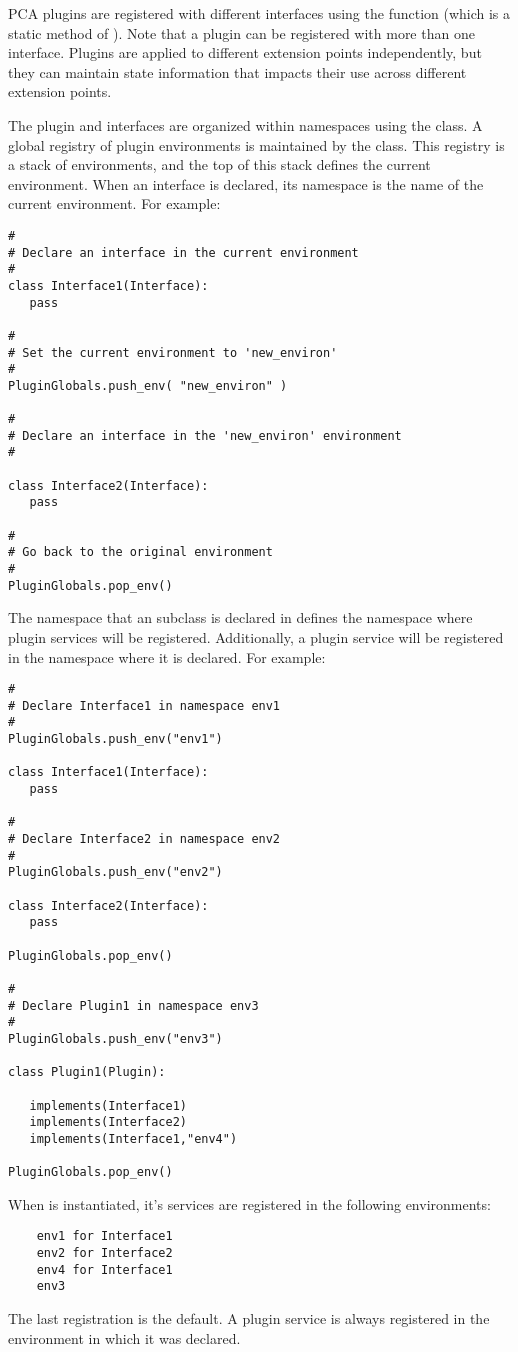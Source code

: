 PCA plugins are registered with different interfaces using the 
function (which is a static method of ). Note that a plugin can be
registered with more than one interface. Plugins are applied to different
extension points independently, but they can maintain state information
that impacts their use across different extension points.

The plugin and interfaces are organized within namespaces using the
 class. A global registry of plugin environments
is maintained by the  class. This registry is a stack
of environments, and the top of this stack defines the current
environment. When an interface is declared, its namespace is the name
of the current environment. For example:
\begin{lstlisting}
#
# Declare an interface in the current environment
#
class Interface1(Interface):
   pass

#
# Set the current environment to 'new_environ'
#
PluginGlobals.push_env( "new_environ" )

#
# Declare an interface in the 'new_environ' environment
#

class Interface2(Interface):
   pass

#
# Go back to the original environment
#
PluginGlobals.pop_env()
\end{lstlisting}
The namespace that an  subclass is declared in defines the
namespace where plugin services will be registered. Additionally,
a plugin service will be registered in the namespace where it is
declared. For example:
\begin{lstlisting}
#
# Declare Interface1 in namespace env1
#
PluginGlobals.push_env("env1")

class Interface1(Interface):
   pass

#
# Declare Interface2 in namespace env2
#
PluginGlobals.push_env("env2")

class Interface2(Interface):
   pass

PluginGlobals.pop_env()

#
# Declare Plugin1 in namespace env3
#
PluginGlobals.push_env("env3")

class Plugin1(Plugin):

   implements(Interface1)
   implements(Interface2)
   implements(Interface1,"env4")

PluginGlobals.pop_env()
\end{lstlisting}
When  is instantiated, it's services are registered in the 
following environments:
\begin{lstlisting}
    env1 for Interface1
    env2 for Interface2
    env4 for Interface1
    env3
\end{lstlisting}
The last registration is the default. A plugin service is always
registered in the environment in which it was declared.

